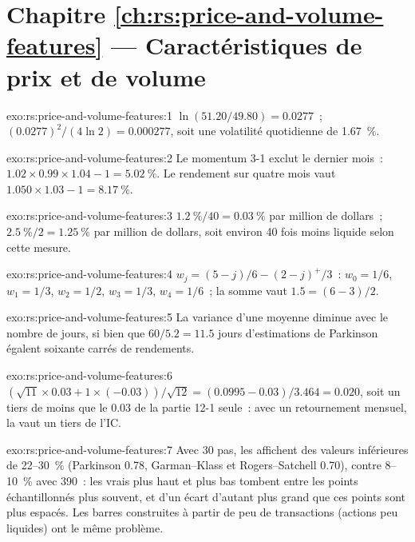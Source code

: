 \section*{Chapitre \ref{ch:rs:price-and-volume-features} --- Caractéristiques de prix et de volume}

\begin{solution}{exo:rs:price-and-volume-features:1}
$\ln(51.20/49.80) = 0.0277$~; $(0.0277)^2/(4\ln2) = 0.000277$, soit une volatilité quotidienne de 1.67~\%.
\end{solution}

\begin{solution}{exo:rs:price-and-volume-features:2}
Le momentum 3-1 exclut le dernier mois~: $1.02 \times 0.99 \times 1.04 - 1 = 5.02~\%$. Le rendement sur quatre mois vaut $1.050 \times 1.03 - 1 = 8.17~\%$.
\end{solution}

\begin{solution}{exo:rs:price-and-volume-features:3}
$1.2~\%/40 = 0.03~\%$ par million de dollars~; $2.5~\%/2 = 1.25~\%$ par million de dollars, soit environ 40 fois moins liquide selon cette mesure.
\end{solution}

\begin{solution}{exo:rs:price-and-volume-features:4}
$w_j = (5 - j)/6 - (2 - j)^+/3$~: $w_0 = 1/6$, $w_1 = 1/3$, $w_2 = 1/2$, $w_3 = 1/3$, $w_4 = 1/6$~; la somme vaut $1.5 = (6 - 3)/2$.
\end{solution}

\begin{solution}{exo:rs:price-and-volume-features:5}
La variance d'une moyenne diminue avec le nombre de jours, si bien que $60/5.2 = 11.5$ jours d'estimations de Parkinson égalent soixante
carrés de rendements.
\end{solution}

\begin{solution}{exo:rs:price-and-volume-features:6}
$(\sqrt{11} \times 0.03 + 1 \times (-0.03))/\sqrt{12} = (0.0995 - 0.03)/3.464 = 0.020$, soit un tiers de moins que le 0.03 de la partie 12-1
seule~: avec un retournement mensuel, la  vaut un tiers de l'IC.
\end{solution}

\begin{solution}{exo:rs:price-and-volume-features:7}
Avec 30 pas, les  affichent des valeurs inférieures de 22--30~\% (Parkinson 0.78, Garman--Klass et Rogers--Satchell 0.70), contre 8--10~\% avec 390~:
les vrais plus haut et plus bas tombent entre les points échantillonnés plus souvent, et d'un écart d'autant plus grand que ces points sont plus espacés. Les barres construites à partir de peu de transactions
(actions peu liquides) ont le même problème.
\end{solution}

